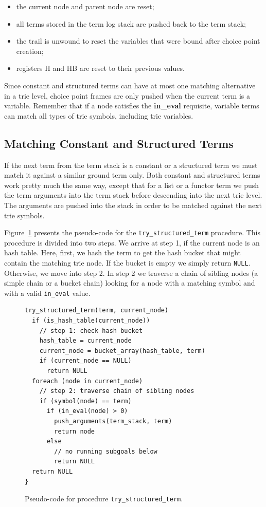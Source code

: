 \begin{itemize}
\item the current node and parent node are reset;
\item all terms stored in the term log stack are pushed back to the
  term stack;
\item the trail is unwound to reset the variables that were bound
  after choice point creation;
\item registers H and HB are reset to their previous values.
\end{itemize}

Since constant and structured terms can have at most one matching
alternative in a trie level, choice point frames are only pushed when
the current term is a variable. Remember that if a node satisfies the
\textbf{in\_eval} requisite, variable terms can match all types of trie
symbols, including trie variables.

\subsection{Matching Constant and Structured Terms}

If the next term from the term stack is a constant or a structured
term we must match it against a similar ground term only. Both
constant and structured terms work pretty much the same way, except
that for a list or a functor term we push the term arguments into the
term stack before descending into the next trie level. The arguments
are pushed into the stack in order to be matched against the next trie
symbols.

Figure~\ref{fig:try_structured_term} presents the pseudo-code for the
\texttt{try\_structured\_term} procedure. This procedure is divided into
two steps. We arrive at step 1, if the current node is an hash
table. Here, first, we hash the term to get the hash bucket that might
contain the matching trie node. If the bucket is empty we simply
return \texttt{NULL}. Otherwise, we move into step 2. In step 2 we traverse a
chain of sibling nodes (a simple chain or a bucket chain) looking for
a node with a matching symbol and with a valid \texttt{in\_eval} value.

\begin{figure}[ht]
\begin{Verbatim}
try_structured_term(term, current_node)
  if (is_hash_table(current_node))
    // step 1: check hash bucket
    hash_table = current_node
    current_node = bucket_array(hash_table, term)
    if (current_node == NULL)
      return NULL
  foreach (node in current_node)
    // step 2: traverse chain of sibling nodes
    if (symbol(node) == term)
      if (in_eval(node) > 0)
        push_arguments(term_stack, term)
        return node
      else
        // no running subgoals below
        return NULL
  return NULL
}
\end{Verbatim}
\caption{Pseudo-code for procedure \texttt{try\_structured\_term}.}
\label{fig:try_structured_term}
\end{figure}

